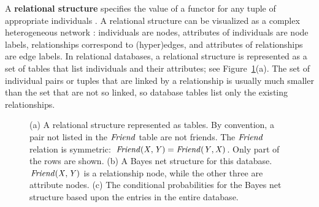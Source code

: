 \documentclass[oribibl]{llncs}
\begin{document}


A \textbf{relational structure} specifies the value of a functor for any tuple of appropriate individuals \cite{Chiang2012}. A relational structure can be visualized as a complex heterogeneous network \cite[Ch.8.2.1]{Russell2010}: individuals are nodes, attributes of individuals are node labels, relationships correspond to (hyper)edges, and attributes of relationships are edge labels. In relational databases, a relational structure is represented as a set of tables that list individuals and their attributes; see Figure~\ref{fig:recurse}(a). The set of individual pairs or tuples that are linked by a relationship is usually much smaller than the set that are not so linked, so database tables list only the existing relationships.

\begin{figure}[t]
\begin{center}
\caption{(a) A relational structure represented as tables. By convention, a pair not listed in the $\it{Friend}$ table are not friends. The $\it{Friend}$ relation is symmetric: $\it{Friend}(X,Y) = \it{Friend}(Y,X)$. Only part of the rows are shown. (b) A Bayes net structure for this database. $\it{Friend}(X,Y)$ is a relationship node, while the other three are attribute nodes. (c) The conditional probabilities for the Bayes net structure based upon the entries in the entire database.}
\label{fig:recurse}
\end{center}
\end{figure}
\end{document}
